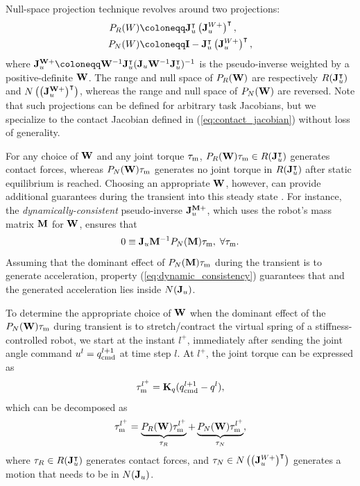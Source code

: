 Null-space projection technique revolves around two projections: 
\begin{subequations}

\begin{align}
P_R(W) &\coloneqq \J_u^\intercal \left(\J_u^{W +}\right)^\intercal, \\
P_N(W) &\coloneqq \mb{I} - \J_u^\intercal \left(\J_u^{W +}\right)^\intercal,
\end{align}
\end{subequations}
where $\J_u^{\mb{W}+} \coloneqq \mb{W}^{-1} \J_u^\intercal (\J_u \mb{W}^{-1} \J_u^\intercal)^{-1}$ is the pseudo-inverse weighted by a positive-definite $\mb{W}$. The range and null space of $P_R(\mb{W})$ are respectively $R(\J_u^\intercal)$ and $N\left(\left(\J_u^{\mb{W}+}\right)^\intercal\right)$, whereas the range and null space of $P_N(\mb{W})$ are reversed. Note that such projections can be defined for arbitrary task Jacobians, but we specialize to the contact Jacobian defined in (\ref{eq:contact_jacobian}) without loss of generality.

For any choice of $\mb{W}$ and any joint torque $\tauM$, $P_R(\mb{W}) \tauM \in R(\J_u^\intercal)$ generates contact forces, whereas $P_N(\mb{W}) \tauM$ generates no joint torque in $R(\J_u^\intercal)$ after static equilibrium is reached. Choosing an appropriate $\mb{W}$, however, can provide additional guarantees during the transient into this steady state \cite{dietrich2015overview}. For instance, the \textit{dynamically-consistent} pseudo-inverse $\J_u^{\mb{M}+}$\cite{featherstone1997load}, which uses the robot's mass matrix $\mb{M}$ for $\mb{W}$, ensures that 
\begin{equation}
\label{eq:dynamic_consistency}
0 \equiv \J_u \mb{M}^{-1} P_N(\mb{M}) \tauM, \; \forall \tauM.
\end{equation}
Assuming that the dominant effect of $P_N(\mb{M}) \tauM$ during the transient is to generate acceleration, property (\ref{eq:dynamic_consistency}) guarantees that and the generated acceleration lies inside $N(\J_u)$.

To determine the appropriate choice of $\mb{W}$ when the dominant effect of the $P_N(\mb{W}) \tauM$ during transient is to stretch/contract the virtual spring of a stiffness-controlled robot, we start at the instant $l^+$, immediately after sending the joint angle command $u^l = \qcmd[l+1]$ at time step $l$. At $l^+$, the joint torque can be expressed as 
\begin{equation}
\label{eq:tau_l_stiffness}
\tauM^{l^+} = \mb{K}_q(\qcmd[l+1] - q^l),
\end{equation}
which can be decomposed as 
\begin{equation}
\label{eq:tau_l_decomposition}
\tauM^{l^+} = \underbrace{P_R(\mb{W}) \tauM^{l^+}}_{\tau_R} + \underbrace{P_N(\mb{W}) \tauM^{l^+}}_{\tau_N},
\end{equation}
where $\tau_R \in R(\J_u^\intercal)$ generates contact forces, and $\tau_N \in N\left(\left(\J_u^{W+}\right)^\intercal\right)$ generates a motion that needs to be in $N(\J_u)$.

